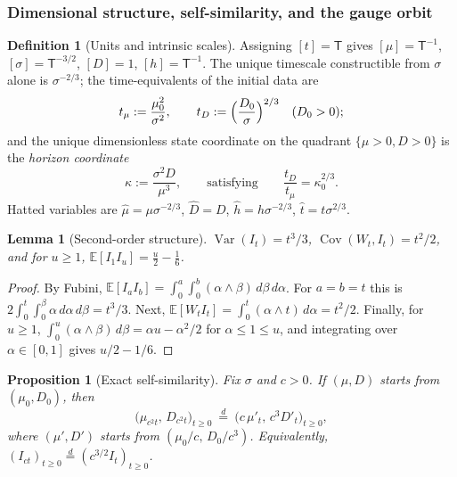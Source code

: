 \documentclass[11pt]{article}
\numberwithin{equation}{section}
\theoremstyle{plain}
\newtheorem{proposition}[theorem]{Proposition}
\newtheorem{lemma}[theorem]{Lemma}
\theoremstyle{definition}
\newtheorem{definition}[theorem]{Definition}
\theoremstyle{remark}
\newcommand{\E}{\mathbb{E}}
\DeclareMathOperator{\Var}{Var}
\DeclareMathOperator{\Cov}{Cov}
\newcommand{\eqd}{\overset{d}{=}}
\begin{document}
\subsubsection{Dimensional structure, self-similarity, and the gauge orbit}
\label{sh:subsub:dimensional}

\begin{definition}[Units and intrinsic scales]\label{sh:def:units}
Assigning $[t]=\mathsf T$ gives $[\mu]=\mathsf T^{-1}$,
$[\sigma]=\mathsf T^{-3/2}$, $[D]=1$, $[h]=\mathsf T^{-1}$. The unique
timescale constructible from $\sigma$ alone is $\sigma^{-2/3}$; the
time-equivalents of the initial data are
\begin{equation}\label{sh:eq:timescales}
t_\mu:=\frac{\mu_0^2}{\sigma^2},\qquad
t_D:=\Bigl(\frac{D_0}{\sigma}\Bigr)^{2/3}\quad(D_0>0);
\end{equation}
and the unique dimensionless state coordinate on the quadrant
$\{\mu>0,D>0\}$ is the \emph{horizon coordinate}
\begin{equation}\label{sh:eq:kappa}
\kappa:=\frac{\sigma^2D}{\mu^3},\qquad\text{satisfying}\qquad
\frac{t_D}{t_\mu}=\kappa_0^{2/3}.
\end{equation}
Hatted variables are $\hat\mu=\mu\sigma^{-2/3}$, $\hat D=D$,
$\hat h=h\sigma^{-2/3}$, $\hat t=t\sigma^{2/3}$.
\end{definition}

\begin{lemma}[Second-order structure]\label{sh:lem:secondorder}
$\Var(I_t)=t^3/3$, $\Cov(W_t,I_t)=t^2/2$, and for $u\ge1$,
$\E[I_1I_u]=\tfrac u2-\tfrac16$.
\end{lemma}

\begin{proof}
By Fubini, $\E[I_aI_b]=\int_0^a\!\int_0^b(\alpha\wedge\beta)\,d\beta\,d\alpha$.
For $a=b=t$ this is $2\int_0^t\!\int_0^\beta\alpha\,d\alpha\,d\beta=t^3/3$.
Next, $\E[W_tI_t]=\int_0^t(\alpha\wedge t)\,d\alpha=t^2/2$. Finally, for
$u\ge1$, $\int_0^u(\alpha\wedge\beta)\,d\beta
=\alpha u-\alpha^2/2$ for $\alpha\le1\le u$, and integrating over
$\alpha\in[0,1]$ gives $u/2-1/6$.
\end{proof}

\begin{proposition}[Exact self-similarity]\label{sh:prop:selfsim}
Fix $\sigma$ and $c>0$. If $(\mu,D)$ starts from $(\mu_0,D_0)$, then
\[
\bigl(\mu_{c^2t},\,D_{c^2t}\bigr)_{t\ge0}\ \eqd\
\bigl(c\,\mu'_t,\,c^3D'_t\bigr)_{t\ge0},
\]
where $(\mu',D')$ starts from $(\mu_0/c,\,D_0/c^3)$. Equivalently,
$(I_{ct})_{t\ge0}\eqd(c^{3/2}I_t)_{t\ge0}$.
\end{proposition}
\end{document}
